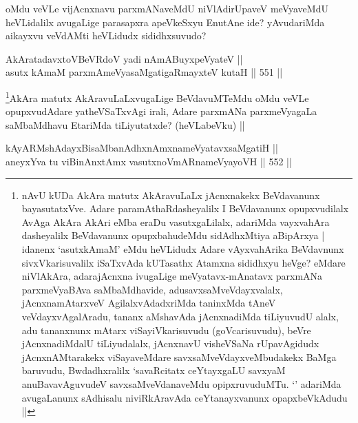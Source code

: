 \begin{artha}
oMdu veVLe vijAcnxnavu parxmANaveMdU niVlAdirUpaveV meVyaveMdU heVLidalilx avugaLige parasapxra apeVkeSxyu EnutAne ide? yAvudariMda aikayxvu veVdAMti heVLidudx sididhxsuvudo? 
\end{artha}


\begin{shl}
AkAratadavxtoVBeVRdoV yadi nAmABuyxpeVyateV ||  \\
asutx kAmaM parxmAmeVyasaMgatigaRmayxteV kutaH ||  551 ||  
\end{shl}

\begin{artha}
\footnote{nAvU kUDa AkAra matutx AkAravuLaLx jAcnxnakekx BeVdavanunx bayasutatxVve. Adare paramAthaRdasheyalilx I BeVdavanunx opupxvudilalx AvAga AkAra AkAri eMba eraDu vasutxgaLilalx, adariMda vayxvahAra dasheyalilx BeVdavanunx opupxbahudeMdu sidAdhxMtiya aBipArxya | idanenx `asutxkAmaM' eMdu heVLidudx Adare vAyxvahArika BeVdavnunx sivxVkarisuvalilx iSaTxvAda kUTasathx Atamxna sididhxyu heVge? eMdare niVlAkAra, adarajAcnxna ivugaLige meVyatavx-mAnatavx parxmANa parxmeVyaBAva saMbaMdhavide, adusavxsaMveVdayxvalalx, jAcnxnamAtarxveV AgilalxvAdadxriMda taninxMda tAneV veVdayxvAgalAradu, tananx aMshavAda jAcnxnadiMda tiLiyuvudU alalx, adu tananxnunx mAtarx viSayiVkarisuvudu (goVcarisuvudu), beVre jAcnxnadiMdalU tiLiyudalalx, jAcnxnavU visheVSaNa rUpavAgidudx jAcnxnAMtarakekx viSayaveMdare savxsaMveVdayxveMbudakekx BaMga baruvudu, Bwdadhxralilx `savaRcitatx ceYtayxgaLU savxyaM anuBavavAguvudeV savxsaMveVdanaveMdu opipxruvuduMTu. `\stext' adariMda avugaLanunx sAdhisalu niviRkAravAda ceYtanayxvanunx opapxbeVkAdudu ||}AkAra matutx AkAravuLaLxvugaLige BeVdavuMTeMdu oMdu veVLe opupxvudAdare yatheVSaTxvAgi irali, Adare parxmANa parxmeVyagaLa saMbaMdhavu EtariMda tiLiyutatxde? (heVLabeVku) ||
\end{artha}


\begin{shl}
kAyARMshAdayxBisaMbanAdhxnAmxnameVyatavxsaMgatiH || \\
aneyxYva tu viBinAnxtAmx vasutxnoVmARnameVyayoVH ||  552 ||  
\end{shl}

